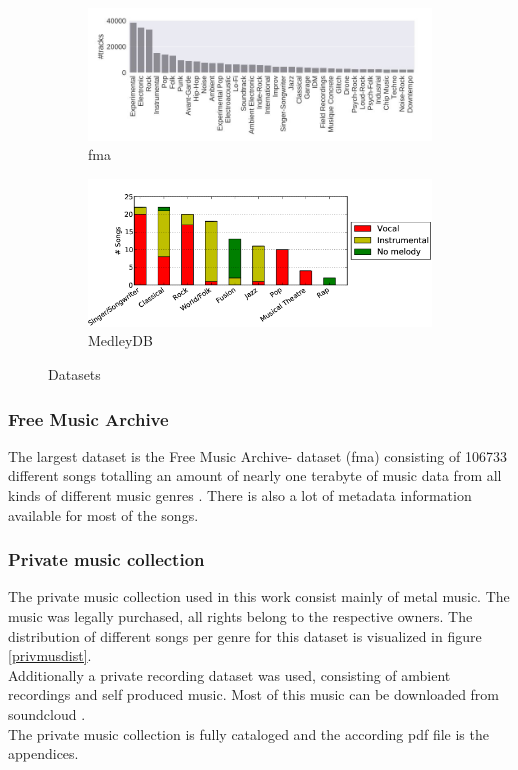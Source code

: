\begin{figure}[htbp]
{{	\begin{subfigure}{0.5\textwidth}
		\centering
		\includegraphics[scale=0.35]{Images/fma_genre.JPG}
		\caption{fma \cite[p. 4]{fma1}}
		\label{fmadist}
	\end{subfigure}
	\begin{subfigure}{0.5\textwidth}
		\centering
		\includegraphics[scale=0.35]{Images/MedleyDB1.png}
		\caption{MedleyDB \cite[p. 2]{medleydb1}}
		\label{medleydbdist}
	\end{subfigure}
	}}
	\caption{Datasets}
	\label{fig:datasetdist}
\end{figure}
\FloatBarrier

\subsubsection{Free Music Archive}

The largest dataset is the Free Music Archive- dataset (fma) consisting of 106733 different songs totalling an amount of nearly one terabyte of music data from all kinds of different music genres \cite{fma1}. There is also a lot of metadata information available for most of the songs.

\subsubsection{Private music collection}

The private music collection used in this work consist mainly of metal music. The music was legally purchased, all rights belong to the respective owners. The distribution of different songs per genre for this dataset is visualized in figure \ref{privmusdist}.\\
\noindent Additionally a private recording dataset was used, consisting of ambient recordings and self produced music. Most of this music can be downloaded from soundcloud \cite{bqpd1}.\\
The private music collection is fully cataloged and the according pdf file is the appendices.

